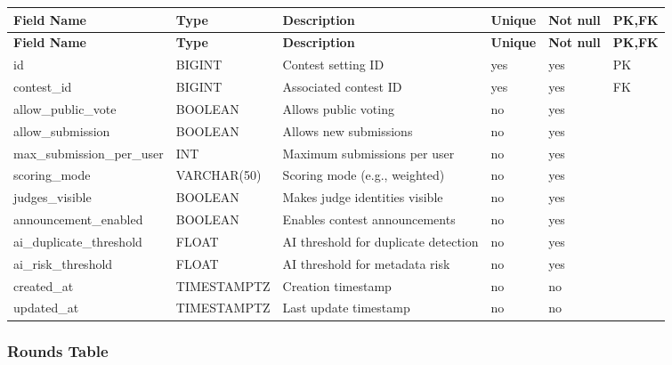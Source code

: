 \vspace{0.5em}
\renewcommand{\arraystretch}{1.15}
\setlength{\tabcolsep}{4pt}
\small
\begin{longtable}{|>{\raggedright\arraybackslash}p{}|>{\raggedright\arraybackslash}p{}|>{\raggedright\arraybackslash}p{}|>{\centering\arraybackslash}p{}|>{\centering\arraybackslash}p{}|>{\centering\arraybackslash}p{}|}
\hline
\textbf{Field Name} & \textbf{Type} & \textbf{Description} & \textbf{Unique} & \textbf{Not null} & \textbf{PK,FK} \\
\hline
\endfirsthead
\textbf{Field Name} & \textbf{Type} & \textbf{Description} & \textbf{Unique} & \textbf{Not null} & \textbf{PK,FK} \\
\hline
\endhead
id & BIGINT & Contest setting ID & yes & yes & PK \\
\hline
contest\_id & BIGINT & Associated contest ID & yes & yes & FK \\
\hline
allow\_public\_vote & BOOLEAN & Allows public voting & no & yes & \\
\hline
allow\_submission & BOOLEAN & Allows new submissions & no & yes & \\
\hline
max\_submission\_per\_user & INT & Maximum submissions per user & no & yes & \\
\hline
scoring\_mode & VARCHAR(50) & Scoring mode (e.g., weighted) & no & yes & \\
\hline
judges\_visible & BOOLEAN & Makes judge identities visible & no & yes & \\
\hline
announcement\_enabled & BOOLEAN & Enables contest announcements & no & yes & \\
\hline
ai\_duplicate\_threshold & FLOAT & AI threshold for duplicate detection & no & yes & \\
\hline
ai\_risk\_threshold & FLOAT & AI threshold for metadata risk & no & yes & \\
\hline
created\_at & TIMESTAMPTZ & Creation timestamp & no & no & \\
\hline
updated\_at & TIMESTAMPTZ & Last update timestamp & no & no & \\
\hline
\end{longtable}

\vspace{1em}
\subsubsection{Rounds Table}
\label{subsubsec:rounds-table}


